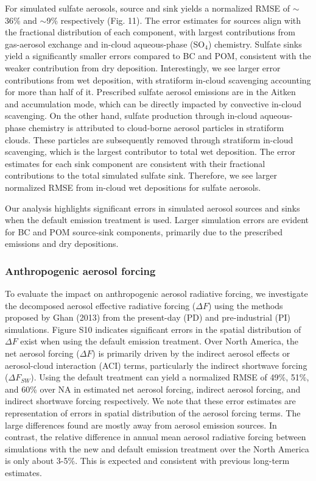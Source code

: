 For simulated sulfate aerosols, source and sink yields a normalized RMSE of $\sim$36\% and $\sim$9\% respectively (Fig. 11). The error estimates for sources align with the fractional distribution of each component, with largest contributions from gas-aerosol exchange and in-cloud aqueous-phase (SO$_4$) chemistry. Sulfate sinks yield a significantly smaller errors compared to BC and POM, consistent with the weaker contribution from dry deposition. Interestingly, we see larger error contributions from wet deposition, with stratiform in-cloud scavenging accounting for more than half of it. Prescribed sulfate aerosol emissions are in the Aitken and accumulation mode, which can be directly impacted by convective in-cloud scavenging. On the other hand, sulfate production through in-cloud aqueous-phase chemistry is attributed to cloud-borne aerosol particles in stratiform clouds. These particles are subsequently removed through stratiform in-cloud scavenging, which is the largest contributor to total wet deposition. The error estimates for each sink component are consistent with their fractional contributions to the total simulated sulfate sink. Therefore, we see larger normalized RMSE from in-cloud wet depositions for sulfate aerosols.

Our analysis highlights significant errors in simulated aerosol sources and sinks when the default emission treatment is used. Larger simulation errors are evident for BC and POM source-sink components, primarily due to the prescribed emissions and dry depositions.

\subsubsection{Anthropogenic aerosol forcing}
To evaluate the impact on anthropogenic aerosol radiative forcing, we investigate the decomposed aerosol effective radiative forcing ($\Delta{F}$) using the methods proposed by Ghan (2013) from the present-day (PD) and pre-industrial (PI) simulations. Figure S10 indicates significant errors in the spatial distribution of $\Delta{F}$ exist when using the default emission treatment. Over North America, the net aerosol forcing ($\Delta{F}$) is primarily driven by the indirect aerosol effects or aerosol-cloud interaction (ACI) terms, particularly the indirect shortwave forcing ($\Delta{F_{SW}}$). Using the default treatment can yield a normalized RMSE of 49\%, 51\%, and 60\% over NA in estimated net aerosol forcing, indirect aerosol forcing, and indirect shortwave forcing respectively. We note that these error estimates are representation of errors in spatial distribution of the aerosol forcing terms. The large differences found are mostly away from aerosol emission sources. In contrast, the relative difference in annual mean aerosol radiative forcing between simulations with the new and default emission treatment over the North America is only about 3-5\%. This is expected and consistent with previous long-term estimates. 

